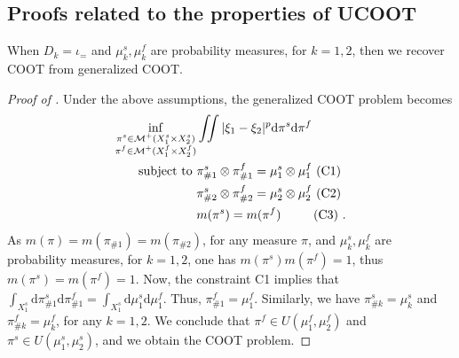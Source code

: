 \subsection{Proofs related to the properties of UCOOT}

\begin{claim}
  \label{claim:ucoot_to_coot}
  When $D_k = \iota_{=}$ and $\mu_k^s, \mu_k^f$ are probability measures, for $k=1,2$,
  then we recover COOT from generalized COOT.
\end{claim}
\begin{proof}[Proof of ]
  Under the above assumptions, the generalized COOT problem becomes
  \begin{equation}
    \begin{split}
      \inf_{\substack{\pi^s \in \mathcal M^+(X_1^s \times X_2^s) \\
      \pi^f \in \mathcal M^+(X_1^f \times X_2^f)}}
      &\iint |\xi_1 - \xi_2|^p \mathrm d\pi^s \mathrm d \pi^f \\
      \text{subject to } &\pi^s_{\#1} \otimes \pi^f_{\#1} = \mu_1^s \otimes \mu_1^f \text{ (C1) } \\
      & \pi^s_{\#2} \otimes \pi^f_{\#2} = \mu_2^s \otimes \mu_2^f \text{ (C2) } \\
      & m(\pi^s) = m(\pi^f) \quad \quad \; \text{ (C3) }.
    \end{split}
  \end{equation}
  As $m(\pi) = m(\pi_{\#1}) = m(\pi_{\#2})$,
  for any measure $\pi$, and $\mu_k^s, \mu_k^f$ are probability measures, for $k=1,2$,
  one has $m(\pi^s) m(\pi^f) = 1$, thus $m(\pi^s) = m(\pi^f) = 1$.
  Now, the constraint C1 implies that
  $\int_{X_1^s} \mathrm d\pi^s_{\#1} \mathrm d \pi^f_{\#1}
  = \int_{X_1^s} \mathrm d\mu_1^s \mathrm d\mu_1^f$. Thus, $\pi^f_{\#1} = \mu_1^f$.
  Similarly, we have $\pi^s_{\#k} = \mu_k^s$ and $\pi^f_{\#k} = \mu_k^f$, for any $k=1,2$.
  We conclude that $\pi^f \in U(\mu_1^f, \mu_2^f)$ and $\pi^s \in U(\mu_1^s, \mu_2^s)$,
  and we obtain the COOT problem.
\end{proof}

